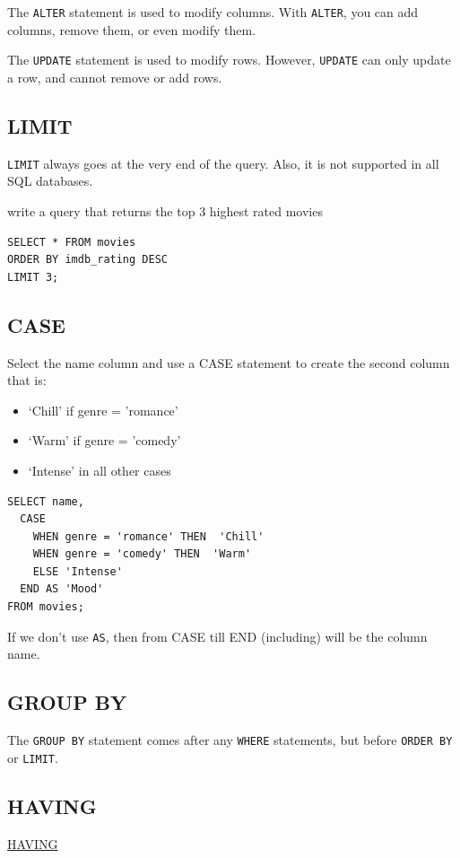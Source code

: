 \documentclass[a4paper, 12pt]{article}
\begin{document}
The \verb|ALTER| statement is used to modify columns. With \verb|ALTER|, you can add columns, remove them, or even modify them.

The \verb|UPDATE| statement is used to modify rows. However, \verb|UPDATE| can only update a row, and cannot remove or add rows.

\subsection{LIMIT}
\verb|LIMIT| always goes at the very end of the query. Also, it is not supported in all SQL databases.

write a query that returns the top 3 highest rated movies
\begin{verbatim}
SELECT * FROM movies
ORDER BY imdb_rating DESC
LIMIT 3;
\end{verbatim}

\subsection{CASE}
Select the name column and use a CASE statement to create the second column that is:
\begin{itemize}
\item ‘Chill’ if genre = 'romance'

\item ‘Warm’ if genre = 'comedy'

\item ‘Intense’ in all other cases

\end{itemize}
\begin{verbatim}
SELECT name,
  CASE
    WHEN genre = 'romance' THEN  'Chill'
    WHEN genre = 'comedy' THEN  'Warm'
    ELSE 'Intense'
  END AS 'Mood'
FROM movies;
\end{verbatim}
If we don't use \verb|AS|, then from CASE till END (including) will be the column name.

\subsection{GROUP BY}
The \verb|GROUP BY| statement comes after any \verb|WHERE| statements, but before \verb|ORDER BY| or \verb|LIMIT|.

\subsection{HAVING}
\href{https://www.codecademy.com/courses/learn-sql/lessons/aggregate-functions/exercises/having?action=resume_content_item}{HAVING}
\end{document}
